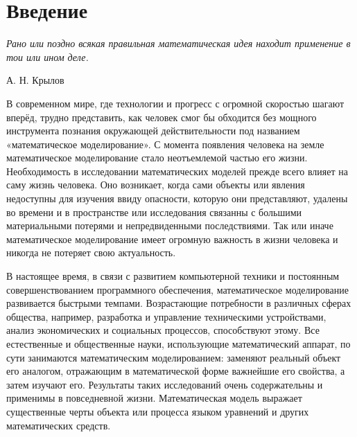 \documentclass[12pt, a4paper]{extarticle}
\numberwithin{equation}{section}
\begin{document}
\justify 
\setlength{\parindent}{1.25cm} 
\newpage 
\thispagestyle{empty} 
\setcounter{page}{2} 

\newpage

\setcounter{page}{2}

\tableofcontents 
\newpage 

\section*{Введение}
\epigraph{\textit{Рано или поздно всякая правильная математическая идея находит применение в тои или ином деле.}}
{А. Н. Крылов}
В современном мире, где технологии и прогресс с огромной скоростью шагают вперёд, трудно представить, как человек смог бы обходится без мощного инструмента познания окружающей действительности под названием «математическое моделирование». С момента появления человека на земле математическое моделирование стало неотъемлемой частью его жизни. Необходимость в исследовании математических моделей прежде всего влияет на саму жизнь человека. Оно возникает, когда сами объекты или явления недоступны для изучения ввиду опасности, которую они представляют, удалены во времени и в пространстве или исследования связанны с большими материальными потерями и непредвиденными последствиями. Так или иначе математическое моделирование имеет огромную важность в жизни человека и никогда не потеряет свою актуальность.

В настоящее время, в связи с развитием компьютерной техники и постоянным совершенствованием программного обеспечения, математическое моделирование развивается быстрыми темпами. Возрастающие потребности в различных сферах общества, например, разработка и управление техническими устройствами, анализ экономических и социальных процессов, способствуют этому. Все естественные и общественные науки, использующие математический аппарат, по сути занимаются математическим моделированием: заменяют реальный объект его аналогом, отражающим в математической форме важнейшие его свойства, а затем изучают его.  Результаты таких исследований очень содержательны и применимы в повседневной жизни. Математическая модель выражает существенные черты объекта или процесса языком уравнений и других математических средств. 
\end{document}
